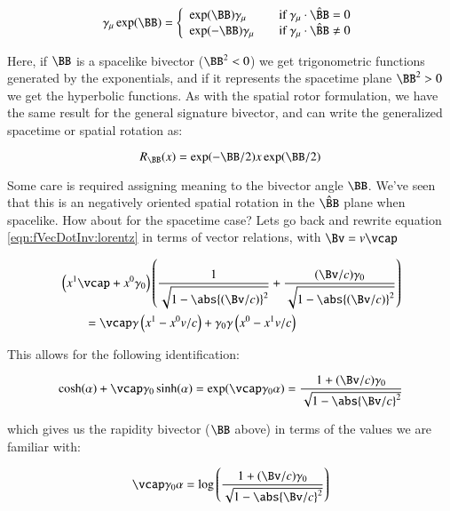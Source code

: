 \begin{equation}\label{eqn:fVecDotInv:generalrule}
\gamma_{\mu}\exp(\BB)
=
\left\{ 
\begin{array}{l l}
\exp(\BB) \gamma_{\mu} & \quad \mbox{if $\gamma_{\mu} \cdot \Bcap = 0$} \\
\exp(-\BB) \gamma_{\mu} & \quad \mbox{if $\gamma_{\mu} \cdot \Bcap \ne 0$}
\end{array} \right.
\end{equation}

Here, if $\BB$ is a spacelike bivector ($\BB^2 < 0$) we get trigonometric functions generated by the exponentials, and if it represents
the spacetime plane $\BB^2 > 0$ we get the hyperbolic functions.  As with the spatial rotor formulation, we have the same result for the
general signature bivector, and can write the generalized spacetime or spatial rotation as:

\begin{equation}
R_{\BB}(x) = \exp(-\BB/2) x \exp(\BB/2)
\end{equation}

Some care is required assigning meaning to the bivector angle $\BB$.  We've seen that this is an negatively oriented spatial rotation in the $
\Bcap$ plane when spacelike.  How about for the spacetime case?
Lets go back and rewrite equation \ref{eqn:fVecDotInv:lorentz} in terms of vector
relations, with $\Bv = v \vcap$

\begin{equation}
\begin{aligned}
&\left( x^1 \vcap + x^0 \gamma_0 \right) 
\left(
\frac{1}{\sqrt{1 -{\abs{(\Bv/c)}}^2}} + \frac{(\Bv/c) \gamma_0}{\sqrt{1 -{\abs{(\Bv/c)}}^2}}
\right) \\
&\qquad =
\vcap \gamma 
\left( x^1 - x^0 v/c \right)
+
\gamma_0 \gamma
\left( x^0 - x^1 v/c \right)
\end{aligned}
\end{equation}

This allows for the following identification:

\begin{equation*}
\cosh(\alpha) + \vcap \gamma_0 \sinh(\alpha) = \exp( \vcap \gamma_0 \alpha)
=
\frac{1 + (\Bv/c) \gamma_0}{\sqrt{1 -{\abs{\Bv/c}}^2}}
\end{equation*}

which gives us the rapidity bivector ($\BB$ above) in terms of the values we are familiar with:

\begin{equation*}
\vcap \gamma_0 \alpha = \log\left( 
\frac{1 + (\Bv/c) \gamma_0}{\sqrt{1 -{\abs{\Bv/c}}^2}} \right)
\end{equation*}


